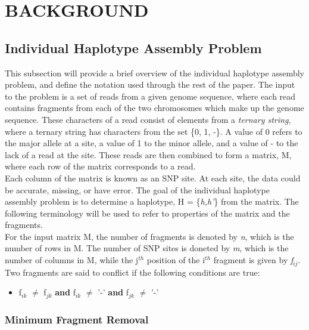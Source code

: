 \documentclass[10pt,twocolumn]{witseiepaper}
\begin{document}

\section{BACKGROUND}

\subsection{Individual Haplotype Assembly Problem}

This subsection will provide a brief overview of the individual haplotype assembly problem, and define the
notation used through the rest of the paper. The input to the problem is a set of reads from a given genome
sequence, where each read contains fragments from each of the two chromosomes which make up the genome
sequence. These characters of a read consist of elements from a \textit{ternary string}, where a ternary
string has characters from the set \{0, 1, -\}. A value of 0 refers to the major allele
at a site, a value of 1 to the minor allele, and a value of - to the lack of a read at the site. These 
reads are then combined to form a matrix, M, where each row of the matrix corresponds to a read. \\
Each column of the matrix is known as an SNP site. At each site, the data could be accurate, missing, or have
error. The goal of the individual haplotype assembly problem is to determine a haplotype, H = \{\textit{h,h'}\}
from the matrix. The following terminology will be used to refer to properties of the matrix and the
fragments. \\
For the input matrix M, the number of fragments is denoted by \textit{n}, which is the number of rows in M.
The number of SNP sites is doneted by \textit{m}, which is the number of columns in M, while the j$^{th}$ 
position of the i$^{th}$ fragment is given by \textit{f$_{ij}$}. Two fragments are said to conflict if the 
following conditions are true:
\begin{itemize}
    \item{f$_{ik}$ $\neq$ f$_{jk}$ \textbf{and} f$_{ik}$ $\neq$ '-' \textbf{and} f$_{jk}$ $\neq$ '-' }
\end{itemize}

\subsubsection{Minimum Fragment Removal}









\end{document}
